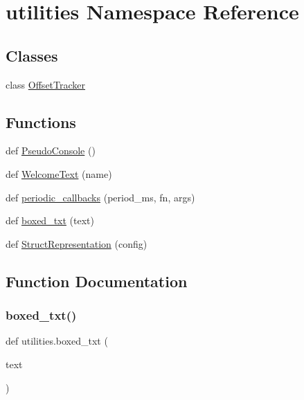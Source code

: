 \hypertarget{namespaceutilities}{}\section{utilities Namespace Reference}
\label{namespaceutilities}
\subsection*{Classes}
\begin{DoxyCompactItemize}
\item 
class \hyperlink{classutilities_1_1OffsetTracker}{Offset\+Tracker}
\end{DoxyCompactItemize}
\subsection*{Functions}
\begin{DoxyCompactItemize}
\item 
def \hyperlink{namespaceutilities_a85150e8e264f76b149785770210a7f1a}{Pseudo\+Console} ()
\item 
def \hyperlink{namespaceutilities_a7c64a494f834c091373f2bb148dc2e8c}{Welcome\+Text} (name)
\item 
def \hyperlink{namespaceutilities_a35dce39ce5efc1ca1a29b30ffc373bd0}{periodic\+\_\+callbacks} (period\+\_\+ms, fn, args)
\item 
def \hyperlink{namespaceutilities_a1b199d0cfcd1bf53e1bc40e831493e23}{boxed\+\_\+txt} (text)
\item 
def \hyperlink{namespaceutilities_aa2added918da29f1fa28d3ea24d570d9}{Struct\+Representation} (config)
\end{DoxyCompactItemize}


\subsection{Function Documentation}
\mbox{\label{namespaceutilities_a1b199d0cfcd1bf53e1bc40e831493e23}} 
\subsubsection{\texorpdfstring{boxed\+\_\+txt()}{boxed\_txt()}}
{\footnotesize\ttfamily def utilities.\+boxed\+\_\+txt (\begin{DoxyParamCaption}\item[{}]{text }\end{DoxyParamCaption})}

